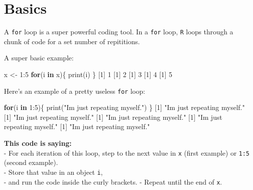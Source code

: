 \documentclass[
]{book}
\newenvironment{Shaded}{\begin{snugshade}}{\end{snugshade}}
\newcommand{\ControlFlowTok}[1]{\textcolor[rgb]{0.13,0.29,0.53}{\textbf{#1}}}
\newcommand{\DecValTok}[1]{\textcolor[rgb]{0.00,0.00,0.81}{#1}}
\newcommand{\FunctionTok}[1]{\textcolor[rgb]{0.00,0.00,0.00}{#1}}
\newcommand{\NormalTok}[1]{#1}
\newcommand{\OtherTok}[1]{\textcolor[rgb]{0.56,0.35,0.01}{#1}}
\newcommand{\SpecialCharTok}[1]{\textcolor[rgb]{0.00,0.00,0.00}{#1}}
\newcommand{\StringTok}[1]{\textcolor[rgb]{0.31,0.60,0.02}{#1}}
\begin{document}
\hypertarget{basics}{%
\section*{Basics}\label{basics}}

A \texttt{for} loop is a super powerful coding tool. In a \texttt{for} loop, \texttt{R} loops through a chunk of code for a set number of repititions.

A super basic example:

\begin{Shaded}
\begin{Highlighting}[]
\NormalTok{x }\OtherTok{\textless{}{-}} \DecValTok{1}\SpecialCharTok{:}\DecValTok{5}
\ControlFlowTok{for}\NormalTok{(i }\ControlFlowTok{in}\NormalTok{ x)\{}
  \FunctionTok{print}\NormalTok{(i)}
\NormalTok{\}}
\NormalTok{[}\DecValTok{1}\NormalTok{] }\DecValTok{1}
\NormalTok{[}\DecValTok{1}\NormalTok{] }\DecValTok{2}
\NormalTok{[}\DecValTok{1}\NormalTok{] }\DecValTok{3}
\NormalTok{[}\DecValTok{1}\NormalTok{] }\DecValTok{4}
\NormalTok{[}\DecValTok{1}\NormalTok{] }\DecValTok{5}
\end{Highlighting}
\end{Shaded}

Here's an example of a pretty useless \texttt{for} loop:

\begin{Shaded}
\begin{Highlighting}[]
\ControlFlowTok{for}\NormalTok{(i }\ControlFlowTok{in} \DecValTok{1}\SpecialCharTok{:}\DecValTok{5}\NormalTok{)\{}
  \FunctionTok{print}\NormalTok{(}\StringTok{"I\textquotesingle{}m just repeating myself."}\NormalTok{)}
\NormalTok{\}}
\NormalTok{[}\DecValTok{1}\NormalTok{] }\StringTok{"I\textquotesingle{}m just repeating myself."}
\NormalTok{[}\DecValTok{1}\NormalTok{] }\StringTok{"I\textquotesingle{}m just repeating myself."}
\NormalTok{[}\DecValTok{1}\NormalTok{] }\StringTok{"I\textquotesingle{}m just repeating myself."}
\NormalTok{[}\DecValTok{1}\NormalTok{] }\StringTok{"I\textquotesingle{}m just repeating myself."}
\NormalTok{[}\DecValTok{1}\NormalTok{] }\StringTok{"I\textquotesingle{}m just repeating myself."}
\end{Highlighting}
\end{Shaded}

\textbf{This code is saying:}\\
- For each iteration of this loop, step to the next value in \texttt{x} (first example) or \texttt{1:5} (second example).\\
- Store that value in an object \texttt{i},\\
- and run the code inside the curly brackets.
- Repeat until the end of \texttt{x}.
\end{document}
